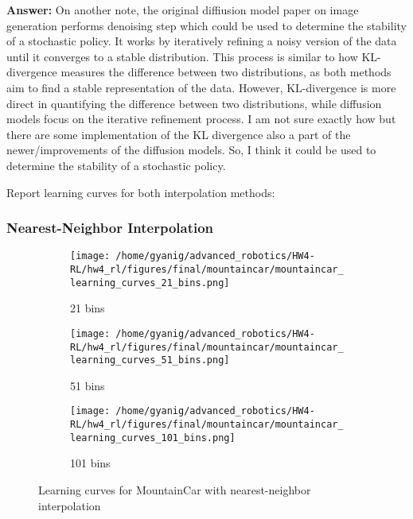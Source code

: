 \documentclass{article}
\newenvironment{answer}{{\bf Answer:} \sf }{}%
\begin{document}
\begin{enumerate}[a)]
\begin{answer}
      On another note, the original diffiusion model paper on image generation performs denoising step which could be used to determine the stability of a stochastic policy. It works by iteratively refining a noisy version of the data until it converges to a stable distribution. This process is similar to how KL-divergence measures the difference between two distributions, as both methods aim to find a stable representation of the data. However, KL-divergence is more direct in quantifying the difference between two distributions, while diffusion models focus on the iterative refinement process. I am not sure exactly how but there are some implementation of the KL divergence also a part of the newer/improvements of the diffusion models. So, I think it could be used to determine the stability of a stochastic policy.  
      \\  
    \end{answer}
\end{enumerate}

Report learning curves for both interpolation methods:

\subsubsection{Nearest-Neighbor Interpolation}
\begin{figure}[H]
    \centering
    \begin{subfigure}{0.32\textwidth}
        \texttt{[image: /home/gyanig/advanced\_robotics/HW4-RL/hw4\_rl/figures/final/mountaincar/mountaincar\_learning\_curves\_21\_bins.png]}
        \caption{21 bins}
    \end{subfigure}
    \begin{subfigure}{0.32\textwidth}
        \texttt{[image: /home/gyanig/advanced\_robotics/HW4-RL/hw4\_rl/figures/final/mountaincar/mountaincar\_learning\_curves\_51\_bins.png]}
        \caption{51 bins}
    \end{subfigure}
    \begin{subfigure}{0.32\textwidth}
        \texttt{[image: /home/gyanig/advanced\_robotics/HW4-RL/hw4\_rl/figures/final/mountaincar/mountaincar\_learning\_curves\_101\_bins.png]}
        \caption{101 bins}
    \end{subfigure}
    \caption{Learning curves for MountainCar with nearest-neighbor interpolation}
\end{figure}
\end{document}
